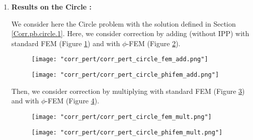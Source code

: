 \begin{enumerate}[label=\textbullet]
	\item \textbf{Results on the Circle :}
	
	We consider here the Circle problem with the solution defined in Section \ref{Corr.pb.circle.1}. Here, we consider correction by adding (without IPP) with standard FEM (Figure \ref{corr_pert_circle_fem_add}) and with $\phi$-FEM (Figure \ref{corr_pert_circle_phifem_add}).
	
	\begin{minipage}{0.48\linewidth}
		\begin{figure}[H]
			\centering
			\texttt{[image: "corr\_pert/corr\_pert\_circle\_fem\_add.png"]}
			\label{corr_pert_circle_fem_add}
		\end{figure} 
	\end{minipage}
	\begin{minipage}{0.48\linewidth}
		\begin{figure}[H]
			\centering
			\texttt{[image: "corr\_pert/corr\_pert\_circle\_phifem\_add.png"]}
			\label{corr_pert_circle_phifem_add}
		\end{figure} 
	\end{minipage}
	
	Then, we consider correction by multiplying with standard FEM (Figure \ref{corr_pert_circle_fem_mult}) and with $\phi$-FEM (Figure \ref{corr_pert_circle_phifem_mult}).
	
	\begin{minipage}{0.48\linewidth}
		\begin{figure}[H]
			\centering
			\texttt{[image: "corr\_pert/corr\_pert\_circle\_fem\_mult.png"]}
			\label{corr_pert_circle_fem_mult}
		\end{figure} 
	\end{minipage}
	\begin{minipage}{0.48\linewidth}
		\begin{figure}[H]
			\centering
			\texttt{[image: "corr\_pert/corr\_pert\_circle\_phifem\_mult.png"]}
			\label{corr_pert_circle_phifem_mult}
		\end{figure} 
	\end{minipage}
	

\end{enumerate}
